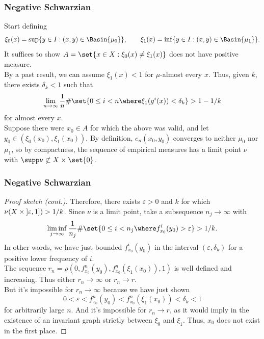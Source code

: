 \documentclass[shortlabels, 9pt, aspectratio=2013]{beamer}
\begin{document}
\begin{frame}
  \frametitle{Negative Schwarzian}
  \begin{proofs}
    Start defining
    \begin{equation*}
      \xi_0(x) = \sup \{ y \in I : (x,y) \in \Basin{\mu_0} \}, \qquad \xi_1(x) = \inf \{ y \in I : (x,y) \in \Basin{\mu_1} \}.
    \end{equation*}
    It suffices to show \(A = \set{ x \in X : \xi_0(x) \neq \xi_1(x) }\) does not have positive measure.\\[1em]

    By a past result, we can assume \(\xi_1(x) < 1\) for \(\mu\)-almost every \(x\). Thus, given \(k\), there exists \(\delta_k < 1\) such that
    \begin{equation}\label{eq:time-small}
      \lim_{n \to \infty} \frac{1}{n} \# \set{ 0 \leq i < n \where \xi_1(g^i(x)) < \delta_k} > 1 - 1/k
    \end{equation}
    for almost every \(x\).\\[1em]

    Suppose there were \(x_0 \in A\) for which the above was valid, and let \(y_0 \in (\xi_0(x_0), \xi_1(x_0))\). By definition, \(e_n(x_0,y_0)\) converges to neither \(\mu_0\) nor \(\mu_1\), so by compactness, the sequence of empirical measures has a limit point \(\nu\) with \(\supp \nu \not\subset X \times \set{0}\).
  \end{proofs}
\end{frame}
\begin{frame}
  \frametitle{Negative Schwarzian}
  \begin{proof}[Proof sketch (cont.)]
    Therefore, there exists \(\varepsilon > 0\) and \(k\) for which \(\nu(X \times \interval[open left]{\varepsilon}{1}) > 1/k\). Since \(\nu\) is a limit point, take a subsequence \(n_j \to \infty\) with
    \begin{equation}\label{eq:time-big}
      \liminf_{j \to \infty} \frac{1}{n_j} \# \set{ 0 \leq i < n_j \where f_{x_0}^i(y_0) > \varepsilon} > 1/k.
    \end{equation}
    In other words, we have just bounded \(f_{x_0}^i(y_0)\) in the interval \((\varepsilon, \delta_k)\) for a positive lower frequency of \(i\).\\[1em]

    The sequence \(r_n = \rho(0, f_{x_0}^n(y_0), f_{x_0}^n(\xi_1(x_0)), 1)\) is well defined and increasing. Thus either \(r_n \to \infty\) or \(r_n \to r\).\\[1em]

    But it's impossible for \(r_n \to \infty\) because we have just shown
    \[0 < \varepsilon < f^n_{x_0}(y_0) < f^n_{x_0}(\xi_1(x_0)) < \delta_k < 1\]
    for arbitrarily large \(n\). And it's impossible for \(r_n \to r\), as it would imply in the existence of an invariant graph strictly between \(\xi_0\) and \(\xi_1\). Thus, \(x_0\) does not exist in the first place.
  \end{proof}
\end{frame}
\end{document}
